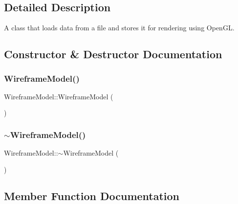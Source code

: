 \subsection{Detailed Description}
A class that loads data from a file and stores it for rendering using Open\+GL. 

\subsection{Constructor \& Destructor Documentation}
\mbox{\label{class_wireframe_model_aab69007d1aea9e74f8639d6264e6b61f}} 
\subsubsection{\texorpdfstring{Wireframe\+Model()}{WireframeModel()}}
{\footnotesize\ttfamily Wireframe\+Model\+::\+Wireframe\+Model (\begin{DoxyParamCaption}{ }\end{DoxyParamCaption})}

\mbox{\label{class_wireframe_model_a57ec6b8bf2a697a074903d42e4db90d4}} 
\subsubsection{\texorpdfstring{$\sim$\+Wireframe\+Model()}{~WireframeModel()}}
{\footnotesize\ttfamily Wireframe\+Model\+::$\sim$\+Wireframe\+Model (\begin{DoxyParamCaption}{ }\end{DoxyParamCaption})}



\subsection{Member Function Documentation}
\mbox{\label{class_wireframe_model_a1d20cf72b2f6412985f5fa2fddcec3ee}} 
